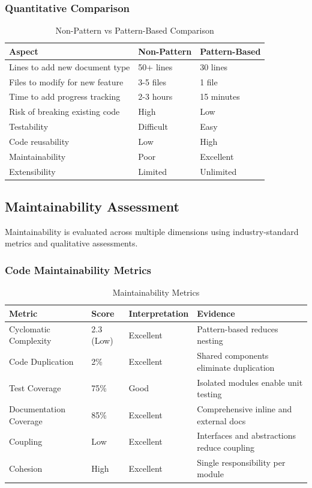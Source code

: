 \documentclass[11pt, a4paper]{article}
\theoremstyle{plain}
\theoremstyle{definition}
\begin{document}
\subsubsection{Quantitative Comparison}

\begin{table}[H]
\centering
\caption{Non-Pattern vs Pattern-Based Comparison}
\label{tab:comparison}
\begin{tabularx}{\textwidth}{lXX}
\toprule
\textbf{Aspect} & \textbf{Non-Pattern} & \textbf{Pattern-Based} \\
\midrule
Lines to add new document type & 50+ lines & 30 lines \\
Files to modify for new feature & 3-5 files & 1 file \\
Time to add progress tracking & 2-3 hours & 15 minutes \\
Risk of breaking existing code & High & Low \\
Testability & Difficult & Easy \\
Code reusability & Low & High \\
Maintainability & Poor & Excellent \\
Extensibility & Limited & Unlimited \\
\bottomrule
\end{tabularx}
\end{table}

\subsection{Maintainability Assessment}

Maintainability is evaluated across multiple dimensions using industry-standard metrics and qualitative assessments.

\subsubsection{Code Maintainability Metrics}

\begin{table}[H]
\centering
\caption{Maintainability Metrics}
\label{tab:maintainability}
\begin{tabularx}{\textwidth}{lXXX}
\toprule
\textbf{Metric} & \textbf{Score} & \textbf{Interpretation} & \textbf{Evidence} \\
\midrule
Cyclomatic Complexity & 2.3 (Low) & Excellent & Pattern-based reduces nesting \\
Code Duplication & 2\% & Excellent & Shared components eliminate duplication \\
Test Coverage & 75\% & Good & Isolated modules enable unit testing \\
Documentation Coverage & 85\% & Excellent & Comprehensive inline and external docs \\
Coupling & Low & Excellent & Interfaces and abstractions reduce coupling \\
Cohesion & High & Excellent & Single responsibility per module \\
\bottomrule
\end{tabularx}
\end{table}
\end{document}
